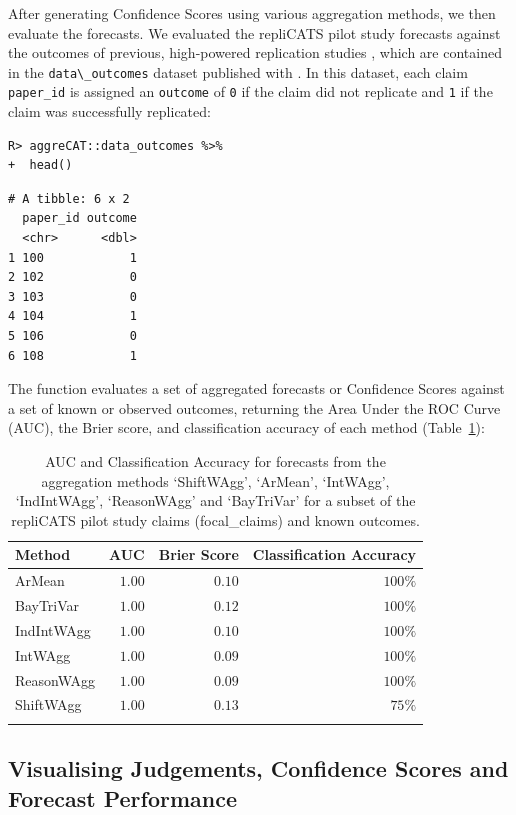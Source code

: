 \documentclass[article]{jss}
\newcommand{\fct}[1]{\code{#1()}}
\begin{document}
After generating Confidence Scores using various aggregation methods, we
then evaluate the forecasts. We evaluated the repliCATS pilot study
forecasts against the outcomes of previous, high-powered replication
studies \citep{Hanea2021}, which are contained in the
\texttt{data\textbackslash{}\_outcomes} dataset published with
. In this dataset, each claim \texttt{paper\_id} is
assigned an \texttt{outcome} of \texttt{0} if the claim did not
replicate and \texttt{1} if the claim was successfully replicated:

\begin{verbatim}
R> aggreCAT::data_outcomes %>% 
+  head()
\end{verbatim}

\begin{verbatim}
# A tibble: 6 x 2
  paper_id outcome
  <chr>      <dbl>
1 100            1
2 102            0
3 103            0
4 104            1
5 106            0
6 108            1
\end{verbatim}

The function \fct{confidence_score_evaluation} evaluates a set of
aggregated forecasts or Confidence Scores against a set of known or
observed outcomes, returning the Area Under the ROC Curve (AUC), the
Brier score, and classification accuracy of each method
(Table~\ref{tbl-multi-method-workflow-eval}):

\hypertarget{tbl-multi-method-workflow-eval}{}
\begin{longtable}{lrrr}

\toprule
Method & AUC & Brier Score & Classification Accuracy \\ 
\midrule
ArMean & $1.00$ & $0.10$ & $100\%$ \\ 
BayTriVar & $1.00$ & $0.12$ & $100\%$ \\ 
IndIntWAgg & $1.00$ & $0.10$ & $100\%$ \\ 
IntWAgg & $1.00$ & $0.09$ & $100\%$ \\ 
ReasonWAgg & $1.00$ & $0.09$ & $100\%$ \\ 
ShiftWAgg & $1.00$ & $0.13$ & $75\%$ \\ 
\bottomrule
\caption{\label{tbl-multi-method-workflow-eval}AUC and Classification Accuracy for forecasts from the aggregation
methods `ShiftWAgg', `ArMean', `IntWAgg', `IndIntWAgg', `ReasonWAgg' and
`BayTriVar' for a subset of the repliCATS pilot study claims
(focal\_claims) and known outcomes. }\tabularnewline
\end{longtable}

\hypertarget{visualising-judgements-confidence-scores-and-forecast-performance}{%
\subsection{Visualising Judgements, Confidence Scores and Forecast
Performance}\label{visualising-judgements-confidence-scores-and-forecast-performance}}
\end{document}
